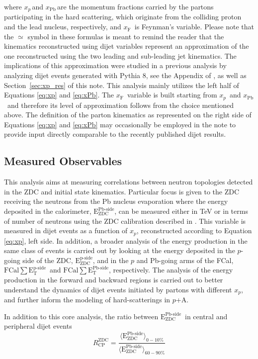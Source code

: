 \documentclass[NOTE, atlasdraft=true, texlive=2020, UKenglish]{atlasdoc}
\newcommand{\EZDC}{$\text{E}_\text{ZDC}^\text{Pb-side}$}
\newcommand{\EZDCp}{$\text{E}_\text{ZDC}^\text{p-side}$}
\newcommand{\EEZDC}{\text{E}_\text{ZDC}^\text{Pb-side}}
\newcommand{\ETPB}{$\text{FCal} \sum \text{E}_{\text{T}}^{\text{Pb-side} }$}
\newcommand{\ETP}{$\text{FCal} \sum \text{E}_{\text{T}}^{\text{p-side} }$}
\newcommand{\xp}{$x_{p}$}
\newcommand{\xPb}{$x_{\text{Pb}}$}
\newcommand{\xf}{$x_{\text{F}}$}
\newcommand{\pxA}{$p$+A}
\begin{document}
where \xp\,and \xPb\,are the momentum fractions carried by the partons participating in the hard scattering, which originate from the colliding proton and the lead nucleus, respectively, and \xf\ is Feynman's variable. 
Please note that the $\simeq$ symbol in these formulas is meant to remind the reader that the kinematics reconstructed using dijet variables represent an approximation of the one reconstructed using the two leading and sub-leading jet kinematics. The implications of this approximation were studied in a previous analysis by analyzing dijet events generated with Pythia 8, see the Appendix of \cite{Longo:2860813}, as well as Section~\ref{sec:xp_res} of this note.
This analysis mainly utilizes the left half of Equations \ref{eq:xp} and \ref{eq:xPb}. 
The \xf\ variable is built starting from \xp\ and \xPb\ and therefore its level of approximation follows from the choice mentioned above. The definition of the parton kinematics as represented on the right side of Equations \ref{eq:xp} and \ref{eq:xPb} may occasionally be employed in the note to provide input directly comparable to the recently published dijet results. 





\subsection{Measured Observables}
\label{sec:meas_obs}

This analysis aims at measuring correlations between neutron topologies detected in the ZDC and initial state kinematics. Particular focus is given to the ZDC receiving the neutrons from the Pb nucleus evaporation where the energy deposited in the calorimeter, \EZDC, can be measured either in TeV or in terms of number of neutrons using the ZDC calibration described in \cite{Hoppesch:2900504}. This variable is measured in dijet events as a function of \xp, reconstructed according to Equation \ref{eq:xp}, left side. In addition, a broader analysis of the energy production in the same class of events is carried out by looking at the energy deposited in the $p$-going side of the ZDC, \EZDCp, and in the $p$ and Pb-going arms of the FCal, \ETP\ and \ETPB, respectively. The analysis of the energy production in the forward and backward regions is carried out to better understand the dynamics of dijet events initiated by partons with different \xp, and further inform the modeling of hard-scatterings in \pxA. 

In addition to this core analysis, the ratio between \EZDC\ in central and peripheral dijet events
\begin{equation}
    R_\text{CP}^\text{ZDC} = \frac{\langle \EEZDC \rangle_{0-10\%} }{\langle \EEZDC \rangle_{60-90\%}}
\end{equation}
\end{document}
